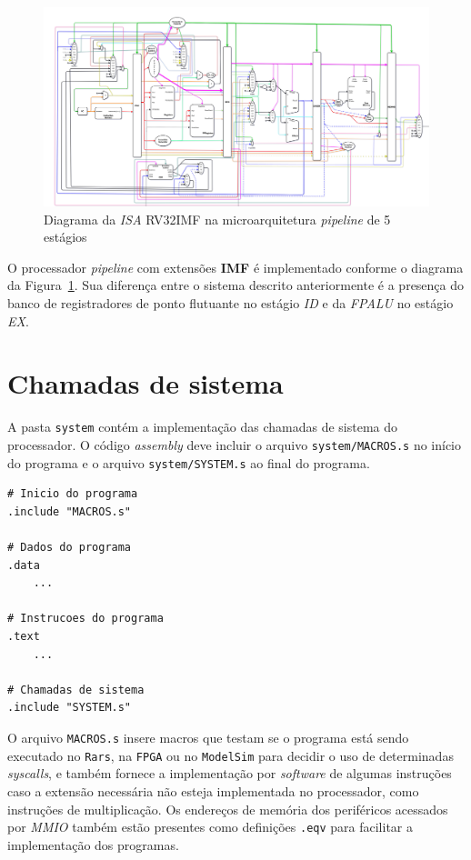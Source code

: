         \begin{figure}[H]
        \centering
            \includegraphics[width=.9\linewidth]{../images/uarch_diagrams/pipeline-RV32IMF.png}
            \caption{Diagrama da \textit{ISA} RV32IMF na microarquitetura
                \textit{pipeline} de 5 estágios}\label{fig:diagram_rv32imf_pipe}
        \end{figure}

        { O processador \textit{pipeline} com extensões \textbf{IMF} é implementado
            conforme o diagrama da Figura~\ref{fig:diagram_rv32imf_pipe}. Sua
            diferença entre o sistema descrito anteriormente é a presença do
            banco de registradores de ponto flutuante no estágio \textit{ID} e
            da \textit{FPALU} no estágio \textit{EX}.
        }

\section{Chamadas de sistema}
    { A pasta \texttt{system} contém a implementação das chamadas de sistema do
        processador. O código \textit{assembly} deve incluir o arquivo
        \texttt{system/MACROS.s} no início do programa e o arquivo
        \texttt{system/SYSTEM.s} ao final do programa.
    }
    \begin{lstlisting}
# Inicio do programa
.include "MACROS.s"

# Dados do programa
.data
    ...

# Instrucoes do programa
.text
    ...

# Chamadas de sistema
.include "SYSTEM.s"
    \end{lstlisting}

    { O arquivo \texttt{MACROS.s} insere macros que testam se o programa
        está sendo executado no \texttt{Rars}, na \texttt{FPGA} ou no
        \texttt{ModelSim} para decidir o uso de determinadas \textit{syscalls},
        e também fornece a implementação por \textit{software} de algumas
        instruções caso a extensão necessária não esteja implementada no processador,
        como instruções de multiplicação. Os endereços de memória dos periféricos
        acessados por \textit{MMIO} também estão presentes como definições
        \texttt{.eqv} para facilitar a implementação dos programas.
    }

